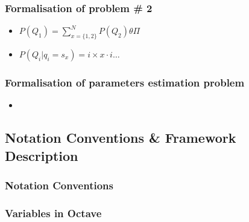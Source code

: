 \begin{frame}
  \frametitle{Formalisation of problem \# 2}
  \begin{itemize}
  \item $P(Q_1) = \displaystyle\sum_{x=\lbrace 1,2 \rbrace}^{N}P(Q_2) \theta\Pi$
  \item $P(Q_i \vert q_i = s_x) = i \times x \cdot i \ldots $
  \end{itemize}
\end{frame}

\begin{frame}
  \frametitle{Formalisation of parameters estimation problem}
  \begin{itemize}
  \item
  \end{itemize}
\end{frame}

\subsection{Notation Conventions \& Framework Description}
\label{sec:octave}

\begin{frame}
  \frametitle{Notation Conventions}

  
\end{frame}


\begin{frame}
  \frametitle{Variables in Octave}

  
\end{frame}
